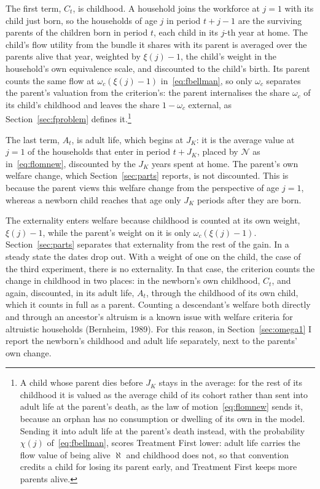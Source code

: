 \documentclass[10pt]{article}
\begin{document}
The first term, $C_t$, is childhood. A household joins the workforce at $j=1$ with its child just born, so the households of age $j$ in period $t+j-1$ are the surviving parents of the children born in period $t$, each child in its $j$-th year at home. The child's flow utility from the bundle it shares with its parent is averaged over the parents alive that year, weighted by $\xi(j)-1$, the child's weight in the household's own equivalence scale, and discounted to the child's birth. Its parent counts the same flow at $\omega_c(\xi(j)-1)$ in~\eqref{eq:fbellman}, so only $\omega_c$ separates the parent's valuation from the criterion's: the parent internalises the share $\omega_c$ of its child's childhood and leaves the share $1-\omega_c$ external, as Section~\ref{sec:fproblem} defines it.\footnote{A child whose parent dies before $J_K$ stays in the average: for the rest of its childhood it is valued as the average child of its cohort rather than sent into adult life at the parent's death, as the law of motion~\eqref{eq:flomnew} sends it, because an orphan has no consumption or dwelling of its own in the model. Sending it into adult life at the parent's death instead, with the probability $\chi(j)$ of~\eqref{eq:fbellman}, scores Treatment First lower: adult life carries the flow value of being alive $\aleph$ and childhood does not, so that convention credits a child for losing its parent early, and Treatment First keeps more parents alive.}

The last term, $A_t$, is adult life, which begins at $J_K$: it is the average value at $j=1$ of the households that enter in period $t+J_K$, placed by $\mathcal N$ as in~\eqref{eq:flomnew}, discounted by the $J_K$ years spent at home.    The parent's own welfare change, which Section~\ref{sec:parts} reports, is not discounted. This is because the parent views this welfare change from the perspective of age $j=1$, whereas a newborn child reaches that age only $J_K$ periods after they are born. 

 The externality enters welfare because childhood is counted at its own weight, $\xi(j)-1$, while the parent's weight on it is only $\omega_c(\xi(j)-1)$. Section~\ref{sec:parts} separates that externality from the rest of the gain. In a steady state the dates drop out. With a weight of one on the child, the case of the third experiment, there is no externality. In that case,  the criterion  counts  the change in childhood in two places: in the newborn's own childhood, $C_t$, and again, discounted, in its adult life, $A_t$, through the childhood of its own child, which it counts in full as a parent. Counting a descendant's welfare both directly and through an ancestor's altruism is a known issue with welfare criteria for altruistic households (Bernheim, 1989). For this reason, in Section~\ref{sec:omega1}  I report the newborn's childhood and adult life separately,  next to the parents' own change.
\end{document}
